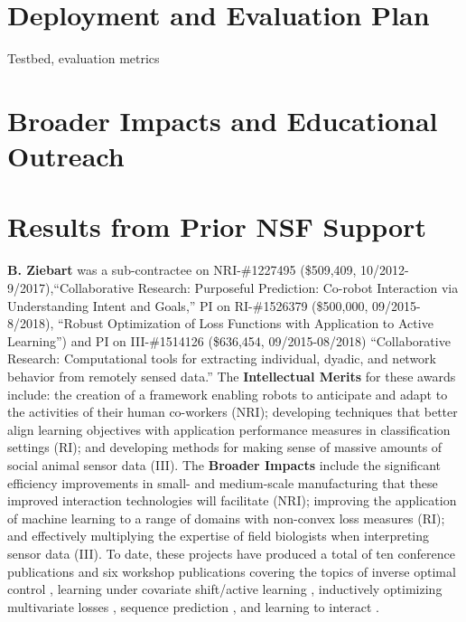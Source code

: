 \documentclass[11pt,letterpaper]{article}
\begin{document}
\section{Deployment and Evaluation Plan}

Testbed, evaluation metrics


\section{Broader Impacts and Educational Outreach}

\section{Results from Prior NSF Support}

\textbf{B. Ziebart} was a sub-contractee on NRI-\#1227495 (\$509,409,
10/2012-9/2017),``Collaborative Research:
Purposeful Prediction: Co-robot Interaction via Understanding Intent
and Goals,'' PI on RI-\#1526379 (\$500,000, 09/2015-8/2018),
``Robust Optimization of Loss Functions with Application to
Active Learning'') and PI on III-\#1514126 (\$636,454, 09/2015-08/2018)
``Collaborative Research: Computational tools for extracting individual,
dyadic, and network behavior from remotely sensed data.''
The {\bf Intellectual Merits} for these awards include: the
creation of a framework enabling robots to anticipate and adapt to the
activities of their human co-workers (NRI); developing techniques that
better align learning objectives with application performance measures
in classification settings (RI);
and developing methods for making sense of massive amounts of social animal
sensor data (III).
The {\bf Broader Impacts}
include the significant efficiency improvements in small- and
medium-scale manufacturing that these improved interaction technologies
will facilitate (NRI); improving the application of machine learning to a
range of domains with non-convex loss measures
(RI); and effectively multiplying the expertise
of field biologists when interpreting sensor data (III).
To date, these projects have produced
a total of ten conference publications and six workshop publications
covering the topics of
inverse optimal control \cite{asif2013inferring,monfort2013predictive,
byravan2014layered,monfort2015intent,chen2015predictive,
byravan2015graph,monfort2015softstar,chen2015imitation,chen2016adversarial},
learning under covariate shift/active learning
\cite{liu2014robust,liu2015shift,behpour2015addressing,chen2016robust},
inductively optimizing multivariate losses \cite{wang2015adversarial},
sequence prediction \cite{li2016adversarial}, and learning to interact
\cite{behpour2015minimax}.
\end{document}
